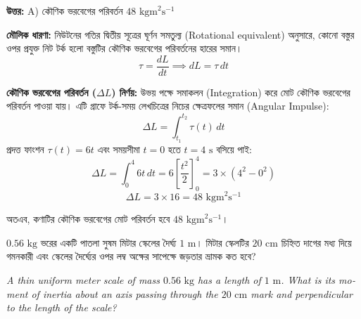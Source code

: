 \documentclass[12pt, a4paper]{article}
\begin{document}
\vspace{0.5em}
\begin{tcolorbox}[answerbox]
\textbf{\color{success} উত্তর:} A) কৌণিক ভরবেগের পরিবর্তন $48\text{ kgm}^2\text{s}^{-1}$
\end{tcolorbox}
\vspace{1em}

\begin{tcolorbox}[solutionbox={সমাধান (Solution)}]
\noindent
\textbf{মৌলিক ধারণা:}
নিউটনের গতির দ্বিতীয় সূত্রের ঘূর্ণন সমতুল্য (Rotational equivalent) অনুসারে, কোনো বস্তুর ওপর প্রযুক্ত নিট টর্ক হলো বস্তুটির কৌণিক ভরবেগের পরিবর্তনের হারের সমান।
$$\tau = \frac{dL}{dt} \implies dL = \tau \, dt$$

\vspace{0.5em}
\textbf{কৌণিক ভরবেগের পরিবর্তন ($\Delta L$) নির্ণয়:}
উভয় পক্ষে সমাকলন (Integration) করে মোট কৌণিক ভরবেগের পরিবর্তন পাওয়া যায়। এটি গ্রাফে টর্ক-সময় লেখচিত্রের নিচের ক্ষেত্রফলের সমান (Angular Impulse):
$$\Delta L = \int_{t_1}^{t_2} \tau(t) \, dt$$
প্রদত্ত ফাংশন $\tau(t) = 6t$ এবং সময়সীমা $t = 0$ হতে $t = 4\text{ s}$ বসিয়ে পাই:
$$\Delta L = \int_0^4 6t \, dt = 6 \left[ \frac{t^2}{2} \right]_0^4 = 3 \times (4^2 - 0^2)$$
$$\Delta L = 3 \times 16 = 48\text{ kgm}^2\text{s}^{-1}$$

অতএব, কণাটির কৌণিক ভরবেগের মোট পরিবর্তন হবে $48\text{ kgm}^2\text{s}^{-1}$।
\end{tcolorbox}
\vspace{1em}


\begin{tcolorbox}[questionbox={প্রশ্ন (Question) 26}]
\noindent
$0.56\text{ kg}$ ভরের একটি পাতলা সুষম মিটার স্কেলের দৈর্ঘ্য $1\text{ m}$। মিটার স্কেলটির $20\text{ cm}$ চিহ্নিত দাগের মধ্য দিয়ে গমনকারী এবং স্কেলের দৈর্ঘ্যের ওপর লম্ব অক্ষের সাপেক্ষে জড়তার ভ্রামক কত হবে?

\vspace{0.8em}
\begin{english}
\noindent\textit{\color{darkgray}
A thin uniform meter scale of mass $0.56\text{ kg}$ has a length of $1\text{ m}$. What is its moment of inertia about an axis passing through the $20\text{ cm}$ mark and perpendicular to the length of the scale?
}
\end{english}
\end{tcolorbox}
\end{document}
